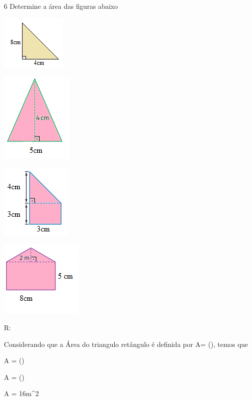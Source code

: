 {\num{6} Determine a área das figuras abaixo
\item
\includegraphics[width=1.26042in,height=1.0625in]{./imgSAEB_8_MAT/media/image46.png}
\item
\includegraphics[width=1.39583in,height=1.72917in]{./imgSAEB_8_MAT/media/image47.png}
\item
\includegraphics[width=1.375in,height=1.42708in]{./imgSAEB_8_MAT/media/image48.png}
\item
\includegraphics[width=1.59375in,height=1.46875in]{./imgSAEB_8_MAT/media/image49.png}

R:

Considerando que a Área do triangulo retângulo é definida por A=
(), temos que
\item

A = ()

A = ()

A = 16m^2
\item

}
